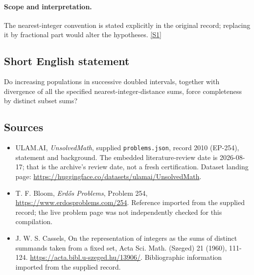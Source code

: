 \documentclass[11pt,a4paper]{article}
\newcommand{\sref}[2]{\hyperlink{source:#1:#2}{[S#2]}}
\begin{document}
\paragraph{Scope and interpretation.}

The nearest-integer convention is stated explicitly in the original record; replacing it by fractional part would alter the hypotheses. \sref{2010}{1}

\subsection{Short English statement}

Do increasing populations in successive doubled intervals, together with divergence of all the specified nearest-integer-distance sums, force completeness by distinct subset sums?

\subsection{Sources}

{\small

\begin{itemize}

\item[\hypertarget{source:2010:1}{S1}] ULAM.AI, \emph{UnsolvedMath}, supplied \texttt{problems.json}, record 2010 (EP-254), statement and background. The embedded literature-review date is 2026-08-17; that is the archive’s review date, not a fresh certification. Dataset landing page: \url{https://huggingface.co/datasets/ulamai/UnsolvedMath}.

\item[\hypertarget{source:2010:2}{S2}] T. F. Bloom, \emph{Erdős Problems}, Problem 254, \url{https://www.erdosproblems.com/254}. Reference imported from the supplied record; the live problem page was not independently checked for this compilation.

\item[\hypertarget{source:2010:3}{S3}] J. W. S. Cassels, On the representation of integers as the sums of distinct summands taken from a fixed set, Acta Sci. Math. (Szeged) 21 (1960), 111-124. \url{https://acta.bibl.u-szeged.hu/13906/}. Bibliographic information imported from the supplied record.

\end{itemize}

}

\label{end:2010}
\end{document}
